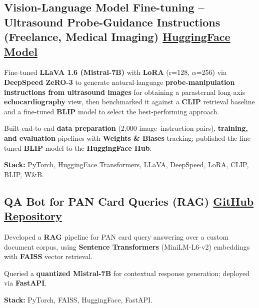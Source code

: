 \documentclass[letter,10pt]{article}
\begin{document}
\subsection{Vision-Language Model Fine-tuning – Ultrasound Probe-Guidance Instructions (Freelance, Medical Imaging) \hfill \href{https://huggingface.co/sunil448832/blip-model}{HuggingFace Model}}
\begin{zitemize}
\item Fine-tuned \textbf{LLaVA 1.6 (Mistral-7B)} with \textbf{LoRA} (r=128, $\alpha$=256) via \textbf{DeepSpeed ZeRO-3} to generate natural-language \textbf{probe-manipulation instructions from ultrasound images} for obtaining a parasternal long-axis \textbf{echocardiography} view, then benchmarked it against a \textbf{CLIP} retrieval baseline and a fine-tuned \textbf{BLIP} model to select the best-performing approach.
\item Built end-to-end \textbf{data preparation} (2,000 image--instruction pairs), \textbf{training, and evaluation} pipelines with \textbf{Weights \& Biases} tracking; published the fine-tuned \textbf{BLIP} model to the \textbf{HuggingFace Hub}.
\item \textbf{Stack:} PyTorch, HuggingFace Transformers, LLaVA, DeepSpeed, LoRA, CLIP, BLIP, W\&B.
\end{zitemize}

\subsection{QA Bot for PAN Card Queries (RAG) \hfill \href{https://github.com/sunil448832/Natural-Language-Processing/tree/master/RAG(Retrieval\%20Augment\%20Generation)}{GitHub Repository}}
\begin{zitemize}
\item Developed a \textbf{RAG} pipeline for PAN card query answering over a custom document corpus, using \textbf{Sentence Transformers} (MiniLM-L6-v2) embeddings with \textbf{FAISS} vector retrieval.
\item Queried a \textbf{quantized Mistral-7B} for contextual response generation; deployed via \textbf{FastAPI}.
\item \textbf{Stack:} PyTorch, FAISS, HuggingFace, FastAPI.
\end{zitemize}
\end{document}
